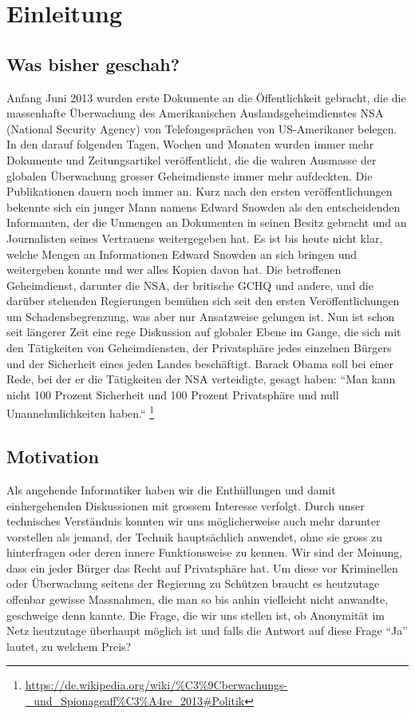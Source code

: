 \section{Einleitung}

\subsection{Was bisher geschah?}
Anfang Juni 2013 wurden erste Dokumente an die Öffentlichkeit gebracht, die die massenhafte Überwachung des Amerikanischen Auslandsgeheimdienstes NSA (National Security Agency) von Telefongesprächen von US-Amerikaner belegen. In den darauf folgenden Tagen, Wochen und Monaten wurden immer mehr Dokumente und Zeitungsartikel veröffentlicht, die die wahren Ausmasse der globalen Überwachung grosser Geheimdienste immer mehr aufdeckten. Die Publikationen dauern noch immer an. Kurz nach den ersten veröffentlichungen bekennte sich ein junger Mann namens Edward Snowden als den entscheidenden Informanten, der die Unmengen an Dokumenten in seinen Besitz gebracht und an Journalisten seines Vertrauens weitergegeben hat. Es ist bis heute nicht klar, welche Mengen an Informationen Edward Snowden an sich bringen und weitergeben konnte und wer alles Kopien davon hat. Die betroffenen Geheimdienst, darunter die NSA, der britische GCHQ und andere, und die darüber stehenden Regierungen bemühen sich seit den ersten Veröffentlichungen um Schadensbegrenzung, was aber nur Ansatzweise gelungen ist. Nun ist schon seit längerer Zeit eine rege Diskussion auf globaler Ebene im Gange, die sich mit den Tätigkeiten von Geheimdiensten, der Privatsphäre jedes einzelnen Bürgers und der Sicherheit eines jeden Landes beschäftigt. Barack Obama soll bei einer Rede, bei der er die Tätigkeiten der NSA verteidigte, gesagt haben: ``Man kann nicht 100 Prozent Sicherheit und 100 Prozent Privatsphäre und null Unannehmlichkeiten haben.“
\footnote{\url{https://de.wikipedia.org/wiki/\%C3\%9Cberwachungs-_und_Spionageaff\%C3\%A4re_2013\#Politik}}

\subsection{Motivation}
Als angehende Informatiker haben wir die Enthüllungen und damit einhergehenden Diskussionen mit grossem Interesse verfolgt. Durch unser technisches Verständnis konnten wir uns möglicherweise auch mehr darunter vorstellen als jemand, der Technik hauptsächlich anwendet, ohne sie gross zu hinterfragen oder deren innere Funktionsweise zu kennen. Wir sind der Meinung, dass ein jeder Bürger das Recht auf Privatsphäre hat. Um diese vor Kriminellen oder Überwachung seitens der Regierung zu Schützen braucht es heutzutage offenbar gewisse Massnahmen, die man so bis anhin vielleicht nicht anwandte, geschweige denn kannte. Die Frage, die wir uns stellen ist, ob Anonymität im Netz heutzutage überhaupt möglich ist und falls die Antwort auf diese Frage ``Ja'' lautet, zu welchem Preis? 


